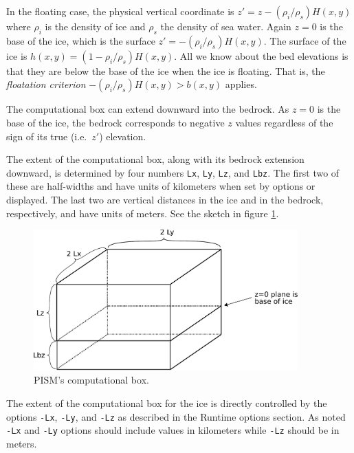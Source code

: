\documentclass[11pt,final]{amsart}
\renewcommand{\t}[1]{\texttt{#1}}
\begin{document}
In the floating case, the physical vertical coordinate is $z'=z-(\rho_i/\rho_s) H(x,y)$ where $\rho_i$ is the density of ice and $\rho_s$ the density of sea water.  Again $z=0$ is the base of the ice, which is the surface $z' = -(\rho_i/\rho_s) H(x,y)$.  The surface of the ice is $h(x,y) = (1-\rho_i/\rho_s) H(x,y)$.  All we know about the bed elevations is that they are below the base of the ice when the ice is floating.  That is, the \emph{floatation criterion} $-(\rho_i/\rho_s) H(x,y) > b(x,y)$ applies.

The computational box can extend downward into the bedrock.  As $z=0$ is the base of the ice, the bedrock corresponds to negative $z$ values regardless of the sign of its true (i.e.~$z'$) elevation.

The extent of the computational box, along with its bedrock extension downward, is determined by four numbers \t{Lx}, \t{Ly}, \t{Lz}, and \t{Lbz}.  The first two of these are half-widths and have units of kilometers when set by options or displayed.  The last two are vertical distances in the ice and in the bedrock, respectively, and have units of meters.  See the sketch in figure \ref{fig:rectilinearbox}.

\begin{figure}[ht]
\includegraphics[width=4.0in,keepaspectratio=true]{figs/rectilinearbox}
\caption{PISM's computational box.}
\label{fig:rectilinearbox}
\end{figure}

The extent of the computational box for the ice is directly controlled by the options \t{-Lx}, \t{-Ly}, and \t{-Lz} as described in the Runtime options section.  As noted \t{-Lx} and \t{-Ly} options should include values in kilometers while \t{-Lz} should be in meters.
\end{document}
